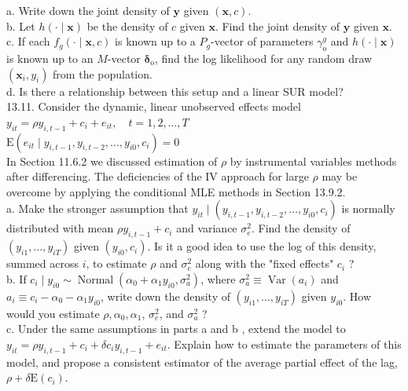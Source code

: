 \documentclass[10pt]{article}
\begin{document}
a. Write down the joint density of $\mathbf{y}$ given $(\mathbf{x}, c)$.\\
b. Let $h(\cdot \mid \mathbf{x})$ be the density of $c$ given $\mathbf{x}$. Find the joint density of $\mathbf{y}$ given $\mathbf{x}$.\\
c. If each $f_{g}(\cdot \mid \mathbf{x}, c)$ is known up to a $P_{g}$-vector of parameters $\gamma_{\mathrm{o}}^{g}$ and $h(\cdot \mid \mathbf{x})$ is known up to an $M$-vector $\boldsymbol{\delta}_{\mathrm{o}}$, find the log likelihood for any random draw $\left(\mathbf{x}_{i}, y_{i}\right)$ from the population.\\
d. Is there a relationship between this setup and a linear SUR model?\\
13.11. Consider the dynamic, linear unobserved effects model\\
$y_{i t}=\rho y_{i, t-1}+c_{i}+e_{i t}, \quad t=1,2, \ldots, T$\\
$\mathrm{E}\left(e_{i t} \mid y_{i, t-1}, y_{i, t-2}, \ldots, y_{i 0}, c_{i}\right)=0$\\
In Section 11.6.2 we discussed estimation of $\rho$ by instrumental variables methods after differencing. The deficiencies of the IV approach for large $\rho$ may be overcome by applying the conditional MLE methods in Section 13.9.2.\\
a. Make the stronger assumption that $y_{i t} \mid\left(y_{i, t-1}, y_{i, t-2}, \ldots, y_{i 0}, c_{i}\right)$ is normally distributed with mean $\rho y_{i, t-1}+c_{i}$ and variance $\sigma_{e}^{2}$. Find the density of $\left(y_{i 1}, \ldots, y_{i T}\right)$ given $\left(y_{i 0}, c_{i}\right)$. Is it a good idea to use the log of this density, summed across $i$, to estimate $\rho$ and $\sigma_{e}^{2}$ along with the "fixed effects" $c_{i}$ ?\\
b. If $c_{i} \mid y_{i 0} \sim \operatorname{Normal}\left(\alpha_{0}+\alpha_{1} y_{i 0}, \sigma_{a}^{2}\right)$, where $\sigma_{a}^{2} \equiv \operatorname{Var}\left(a_{i}\right)$ and $a_{i} \equiv c_{i}-\alpha_{0}-\alpha_{1} y_{i 0}$, write down the density of $\left(y_{i 1}, \ldots, y_{i T}\right)$ given $y_{i 0}$. How would you estimate $\rho, \alpha_{0}, \alpha_{1}$, $\sigma_{e}^{2}$, and $\sigma_{a}^{2}$ ?\\
c. Under the same assumptions in parts a and b , extend the model to $y_{i t}=\rho y_{i, t-1}+ c_{i}+\delta c_{i} y_{i, t-1}+e_{i t}$. Explain how to estimate the parameters of this model, and propose a consistent estimator of the average partial effect of the lag, $\rho+\delta \mathrm{E}\left(c_{i}\right)$.\\
\end{document}
